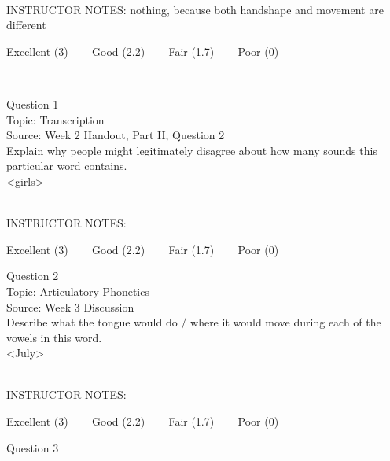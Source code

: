 \documentclass[12pt]{article}
\begin{document}
~\\
INSTRUCTOR NOTES: nothing, because both handshape and movement are different


\vfill
Excellent (3) ~~~ Good (2.2) ~~~ Fair (1.7) ~~~ Poor (0)
\newpage

\begin{center}
\textbf{{\color{red}{\HUGE END OF EXAM}}}\\

\end{center}
\newpage

\begin{center}
\textbf{{\color{blue}{\HUGE START OF EXAM\\}}}

\textbf{{\color{blue}{\HUGE Student ID: 42792\\}}}

\textbf{{\color{blue}{\HUGE \\}}}

\end{center}
\newpage

{\large Question 1}\\

Topic: Transcription\\
Source: Week 2 Handout, Part II, Question 2\\

Explain why people might legitimately disagree about how many sounds this particular word contains.\\

<girls>


~\\
INSTRUCTOR NOTES: 


\vfill
Excellent (3) ~~~ Good (2.2) ~~~ Fair (1.7) ~~~ Poor (0)
\newpage

{\large Question 2}\\

Topic: Articulatory Phonetics\\
Source: Week 3 Discussion\\

Describe what the tongue would do / where it would move during each of the vowels in this word.\\

<July>


~\\
INSTRUCTOR NOTES: 


\vfill
Excellent (3) ~~~ Good (2.2) ~~~ Fair (1.7) ~~~ Poor (0)
\newpage

{\large Question 3}\\
\end{document}
